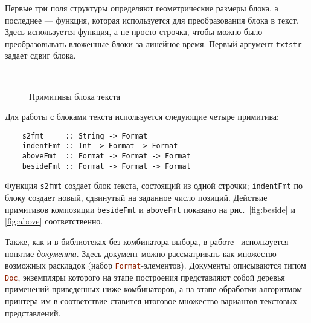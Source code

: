 Первые три поля структуры определяют геометрические размеры блока, а последнее --- функция,
которая используется для преобразования блока в текст. Здесь используется функция, а не
просто строчка, чтобы можно было преобразовывать вложенные блоки за линейное время. Первый
аргумент \lstinline[language = Haskell]{txtstr} задает сдвиг блока.

\begin{figure}
  \centering
  ~
  ~
  \caption{Примитивы блока текста}
  \label{fig:basicConcat}
\end{figure}

Для работы с блоками текста используется следующие четыре примитива:
\begin{lstlisting}
    s2fmt     :: String -> Format
    indentFmt :: Int -> Format -> Format
    aboveFmt  :: Format -> Format -> Format
    besideFmt :: Format -> Format -> Format
\end{lstlisting}

Функция \lstinline[language = Haskell]{s2fmt} создает блок текста,
состоящий из одной строчки; \lstinline[language = Haskell]{indentFmt} по блоку создает новый,
сдвинутый на заданное число позиций. Действие примитивов композиции
\lstinline[language = Haskell]{besideFmt} и \lstinline[language = Haskell]{aboveFmt}
показано на рис.~\ref{fig:beside} и \ref{fig:above} соответственно.

Также, как и в библиотеках без комбинатора выбора, в работе~\cite{swierstra} используется понятие
\emph{документа}. Здесь документ можно рассматривать как множество возможных раскладок
(набор \lstinline[language = Haskell]{Format}-элементов). Документы описываются типом
\lstinline[language = Haskell]{Doc}, экземпляры которого на этапе построения представляют собой
деревья применений приведенных ниже комбинаторов, а на этапе обработки алгоритмом
принтера им в соответствие ставится итоговое множество вариантов текстовых представлений.

